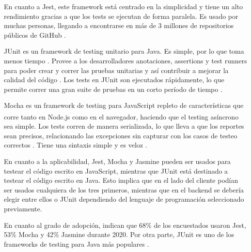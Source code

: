 \documentclass[twoside]{article}
\begin{document}
En cuanto a Jest, este framework está centrado en la simplicidad y tiene un alto rendimiento gracias a que los tests se ejecutan de forma paralela. Es usado por muchas personas, llegando a encontrarse en más de 3 millones de repositorios públicos de GitHub \parencite{jestOfficial}.

JUnit es un framework de testing unitario para Java. Es simple, por lo que toma menos tiempo \parencite{tutorialsPointJUnit}. Provee a los desarrolladores anotaciones, assertions y test runners para poder crear y correr las pruebas unitarias y así contribuir a mejorar la calidad del código \parencite{simplilearnJUnit}. Los tests en JUnit son ejecutados rápidamente, lo que permite correr una gran suite de pruebas en un corto período de tiempo \parencite{codeIntelligenceJUnit}.

Mocha es un framework de testing para JavaScript repleto de características que corre tanto en Node.js\textsuperscript{\textregistered} como en el navegador, haciendo que el testing asíncrono sea simple. Los tests corren de manera serializada, lo que lleva a que los reportes sean precisos, relacionando las excepciones sin capturar con los casos de testeo correctos \parencite{mochaHome}. Tiene una sintaxis simple y es veloz \parencite{mindkTesting}.

En cuanto a la aplicabilidad, Jest, Mocha y Jasmine pueden ser usados para testear el código escrito en JavaScript, mientras que JUnit está destinado a testear el código escrito en Java. Esto implica que en el lado del cliente podían ser usados cualquiera de los tres primeros, mientras que en el backend se debería elegir entre ellos o JUnit dependiendo del lenguaje de programación seleccionado previamente.

En cuanto al grado de adopción, \textcite{stateofjsTesting} indican que 68\% de los encuestados usaron Jest, 53\% Mocha y 42\% Jasmine durante 2020. Por otra parte, JUnit es uno de los frameworks de testing para Java más populares \parencite{headspinJUnit}.
\end{document}

